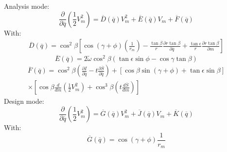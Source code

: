 \documentclass{report}
\begin{document}
        Analysis mode:
        \begin{equation}
            \frac{\partial}{\partial \overline{q}} \left(\frac{1}{2}V_m^2\right) = 
            \overline{D}\left(\overline{q}\right) V_m^2 + \overline{E}\left(\overline{q}\right) V_m + \overline{F}\left(\overline{q}\right)
            \label{eq:analysis}
        \end{equation}
        With:
        \begin{equation}
            \begin{multlined}
                \overline{D}\left(\overline{q}\right) = \cos ^2 \beta \left[
                   \cos \left(\gamma+\phi\right)\left(\frac{1}{r_m}\right)
                    -\frac{\tan \beta}{r}\frac{\partial r \tan \beta}{\partial \overline{q}}
                    +\frac{\tan \epsilon}{r} \frac{\partial r \tan \beta}{\partial m}
                    \right]
            \end{multlined}
        \end{equation}
        \begin{equation}
            \overline{E} \left(\overline{q}\right) = 2 \widetilde{\omega} \cos^2 \beta \left(\tan \epsilon \sin \phi - \cos \gamma \tan \beta\right)
        \end{equation}
        \begin{equation}
            \begin{multlined}
                \overline{F} \left(\overline{q}\right) = \cos ^2 \beta \left(\frac{\partial I}{\partial \overline{q}} - t \frac{\partial \overline{S} }{\partial \overline{q}} \right)
                + \left[
                    \cos \beta \sin \left( \gamma + \phi \right) + \tan \epsilon \sin \beta 
                    \right] 
                \\ \times \left[
                    \cos \beta \frac{d}{dm} \left(\frac{1}{2}V_m^2\right)  + \cos^3 \beta \left(t \frac{d\overline{S}}{dm}\right)
                \right]
            \end{multlined}
        \end{equation}
        Design mode:
        \begin{equation}
            \frac{\partial}{\partial \overline{q}} \left(\frac{1}{2}V_m^2\right) = \overline{G} \left(\overline{q}\right) V_m^2 + \overline{J} \left(\overline{q}\right) V_m + \overline{K} \left(\overline{q}\right)
        \end{equation}
        With:
        \begin{equation}
            \overline{G}\left(\overline{q}\right) = \cos \left(\gamma + \phi\right) \frac{1}{r_m}
        \end{equation}
\end{document}
